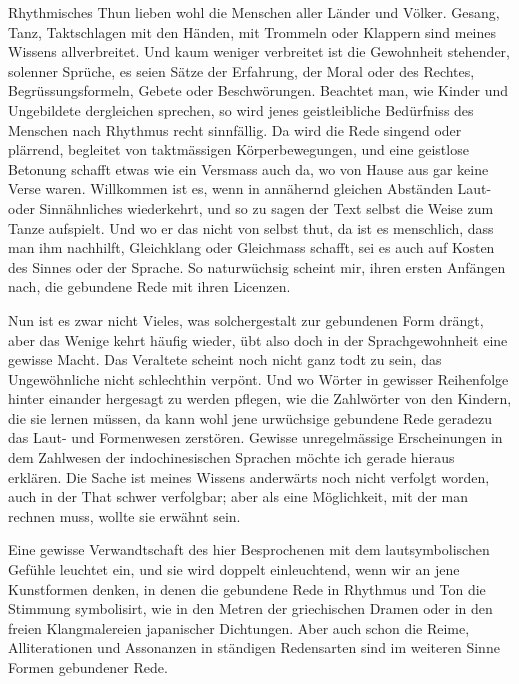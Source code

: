 {Rhythmisches Thun lieben wohl die Menschen aller Länder und Völker. Gesang, Tanz, Taktschlagen mit den Händen, mit Trommeln oder Klappern sind meines Wissens allverbreitet. Und kaum weniger verbreitet ist die Gewohnheit stehender, solenner Sprüche, es seien Sätze der Erfahrung, der Moral oder des Rechtes, Begrüssungsformeln, Gebete oder Beschwörungen. Beachtet man, wie Kinder und Ungebildete dergleichen sprechen, so wird jenes geistleibliche Bedürfniss des Menschen nach Rhythmus recht sinnfällig. Da wird die Rede singend oder plärrend, begleitet von taktmässigen Körperbewegungen, und eine geistlose Betonung schafft etwas wie ein Versmass auch da, wo von Hause aus gar keine Verse waren. Willkommen ist es, wenn in annähernd gleichen Abständen Laut- oder Sinnähnliches wiederkehrt, und so zu sagen der Text selbst die Weise zum Tanze aufspielt. Und wo er das nicht von selbst thut, da ist es menschlich, dass man ihm nachhilft, Gleichklang oder Gleichmass schafft, sei es auch auf Kosten des Sinnes oder der Sprache. So naturwüchsig scheint mir, ihren ersten Anfängen nach, die gebundene Rede mit ihren Licenzen.

Nun ist es zwar nicht Vieles, was solchergestalt zur gebundenen Form drängt, aber das Wenige kehrt häufig wieder, übt also doch in der Sprachgewohnheit eine gewisse Macht. Das Veraltete scheint noch nicht ganz todt zu sein, das Ungewöhnliche nicht schlechthin verpönt. Und wo Wörter in gewisser Reihenfolge hinter einander hergesagt zu werden pflegen, wie die Zahlwörter von den Kindern, die sie lernen müssen, da kann wohl jene urwüchsige gebundene Rede geradezu das Laut- und Formenwesen zerstören. Gewisse unregelmässige Erschei\-\label{fp.225}nungen in dem Zahlwesen der indochinesischen Sprachen \label{sp.227} möchte ich gerade hieraus erklären. Die Sache ist meines Wissens anderwärts noch nicht verfolgt worden, auch in der That schwer verfolgbar; aber als eine Möglichkeit, mit der man rechnen muss, wollte sie erwähnt sein.

Eine gewisse Verwandtschaft des hier Besprochenen mit dem lautsymbolischen Gefühle leuchtet ein, und sie wird doppelt einleuchtend, wenn wir an jene Kunstformen denken, in denen die gebundene Rede in Rhythmus und Ton die Stimmung symbolisirt, wie in den Metren der griechischen Dramen oder in den freien Klangmalereien japanischer Dichtungen. Aber auch schon die Reime, Alliterationen und Assonanzen in ständigen Redensarten sind im weiteren Sinne Formen gebundener Rede.

}
